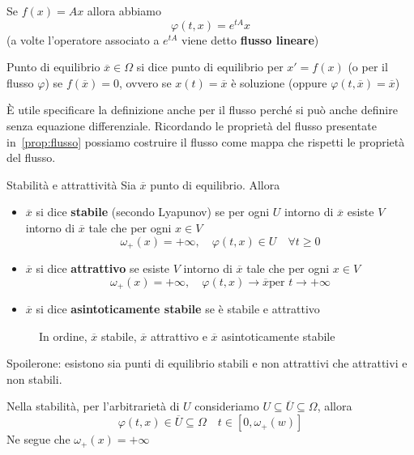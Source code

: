 Se \(f{(x)} = Ax\) allora abbiamo
\[
    \varphi {(t, x)} = e^{tA}x
\]
(a volte l'operatore associato a \(e^{tA}\) viene detto \textbf{flusso lineare}) 

\begin{definition}{Punto di equilibrio}
    \(\overline{x} \in \Omega\) si dice punto di equilibrio per \(x'= f{(x)}\)
    (o per il flusso \(\varphi \)) se \(f{(\overline{x})} = 0\), ovvero se
    \(x{(t)} = \overline{x}\) è soluzione (oppure \(\varphi {(t, \overline{x})}
    = \overline{x}\))
\end{definition}
\begin{remark}
    È utile specificare la definizione anche per il flusso perché si può anche
    definire senza equazione differenziale. Ricordando le proprietà del flusso
    presentate in~\ref{prop:flusso} possiamo costruire il flusso come mappa che
    rispetti le proprietà del flusso.
\end{remark}
\begin{definition}{Stabilità e attrattività}
    Sia \(\overline{x}\) punto di equilibrio. Allora
\begin{itemize}[label = --]
    \item \(\overline{x}\) si dice \textbf{stabile} (secondo Lyapunov) se per
        ogni \(U\) intorno di \(\overline{x}\) esiste \(V\) intorno di
        \(\overline{x}\) tale che per ogni \(x \in V\) 
        \[
          \omega_+{(x)} = +\infty, \quad \varphi {(t, x)} \in U \quad \forall t
          \ge 0
        \]
    \item \(\overline{x}\) si dice \textbf{attrattivo} se esiste \(V\) intorno
        di \(\overline{x}\) tale che per ogni \(x \in V\) 
        \[
          \omega_+{(x)} = +\infty, \quad \varphi {(t,x)} \to \overline{x} \text{
          per } t \to +\infty
      \]
    \item \(\overline{x}\) si dice \textbf{asintoticamente stabile} se è stabile
        e attrattivo
\end{itemize}
\end{definition}
\begin{figure}[ht]
    \centering
    \caption{In ordine, \(\overline{x}\) stabile, \(\overline{x}\) attrattivo e
    \(\overline{x}\) asintoticamente stabile}\label{fig:stabilità-e-attrattività}
\end{figure}

Spoilerone: esistono sia punti di equilibrio stabili e non attrattivi che
attrattivi e non stabili.
\begin{remark}
    Nella stabilità, per l'arbitrarietà di \(U\) consideriamo \(U \subseteq
    \overline{U} \subseteq \Omega  \), allora
    \[
        \varphi {(t, x)} \in  \overline{U} \subseteq \Omega \quad t \in [0,
        \omega_+{(w)}] 
    \]
    Ne segue che \(\omega_+{(x)} = +\infty\) 
\end{remark}
